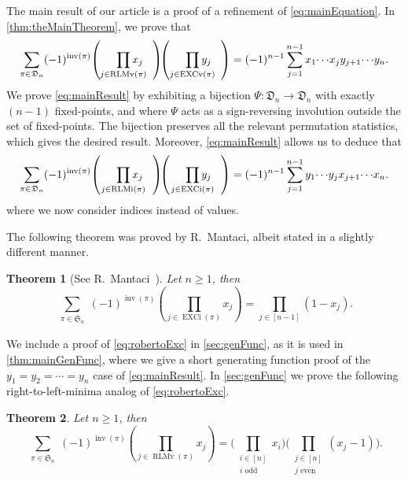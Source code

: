 \documentclass[reqno]{amsart}
\newtheorem{theorem}{Theorem}
\theoremstyle{definition}
\newcommand{\symS}{\mathfrak{S}}
\newcommand{\dArr}{\mathfrak{D}}
\newcommand{\frether}{\Psi}
\DeclareMathOperator{\inv}{inv}
\DeclareMathOperator{\EXCi}{EXCi}
\DeclareMathOperator{\EXCv}{EXCv}
\DeclareMathOperator{\RLMv}{RLMv}
\DeclareMathOperator{\RLMi}{RLMi}
\begin{document}
%
The main result of our article is a
proof of a refinement of \eqref{eq:mainEquation}.
In \cref{thm:theMainTheorem}, we prove that
\begin{equation}\label{eq:mainResult}
 \sum_{\pi \in \dArr_n} (-1)^{\inv(\pi)} \!
 \left( \hspace{5mm}
 \prod_{\mathclap{j\in \RLMv(\pi)}}  x_j 
 \hspace{3mm}
 \right)
 \!\!
 \left( \hspace{5mm}
 \prod_{\mathclap{j\in \EXCv(\pi)}}  y_{j}
 \hspace{3mm}
 \right)
 = 
 (-1)^{n-1} \sum_{j=1}^{n-1} x_1 \!\dotsm \! x_j y_{j+1}  \!\dotsm  \! y_{n}.
\end{equation}
%
We prove \eqref{eq:mainResult} by
exhibiting a bijection $\frether: \dArr_n \to \dArr_n$
with exactly $(n-1)$ fixed-points,
and where $\frether$ acts as a sign-reversing involution
outside the set of fixed-points.
The bijection preserves all
the relevant permutation statistics,
which gives the desired result.
Moreover, \eqref{eq:mainResult} allows us to deduce that
\begin{equation}\label{eq:mainResult2}
\sum_{\pi \in \dArr_n} (-1)^{\inv(\pi)} \!
 \left( \hspace{5mm}
 \prod_{\mathclap{j\in \RLMi(\pi)}}  x_j 
 \hspace{3mm}
 \right)
 \!\!
 \left( \hspace{5mm}
 \prod_{\mathclap{j\in \EXCi(\pi)}}  y_{j}
 \hspace{3mm}
 \right)
 = 
 (-1)^{n-1} \sum_{j=1}^{n-1} y_1 \!\dotsm \! y_j x_{j+1}  \!\dotsm  \! x_{n}.
\end{equation}
where we now consider indices instead of values.

\bigskip 

The following theorem was proved by R.~Mantaci, albeit stated in a slightly different manner.
\begin{theorem}[{See  R.~Mantaci~\cite{Mantaci1993}}]
Let $n \geq 1$, then
\begin{equation}\label{eq:robertoExc}
\sum_{\substack{\pi \in \symS_n}} (-1)^{\inv(\pi)} 
 \left(\prod_{j \in \EXCi(\pi)} x_j \right)
= \prod_{j \in [n-1]} (1-x_j).
\end{equation}
\end{theorem}
We include a proof of \eqref{eq:robertoExc}
in \cref{sec:genFunc}, as it is used in \cref{thm:mainGenFunc},
where we give a short generating function proof of the $y_1=y_2=\dotsb = y_n$
case of \eqref{eq:mainResult}.
%
In \cref{sec:genFunc} we prove the following
right-to-left-minima analog of \eqref{eq:robertoExc}.
\begin{theorem}
Let $n \geq 1$, then
\begin{equation}\label{eq:rlminSumIntro}
 \sum_{\substack{\pi \in \symS_n   }} (-1)^{\inv(\pi)} 
 \left(\prod_{j \in \RLMv(\pi)} x_j \right)
 = 
	\big(\prod_{\substack{i \in [n] \\ i \text{ odd}}} x_i\big)
	\big(\prod_{\substack{j \in [n] \\ j \text{ even}}} (x_j-1)\big).
\end{equation}
\end{theorem}
\end{document}
